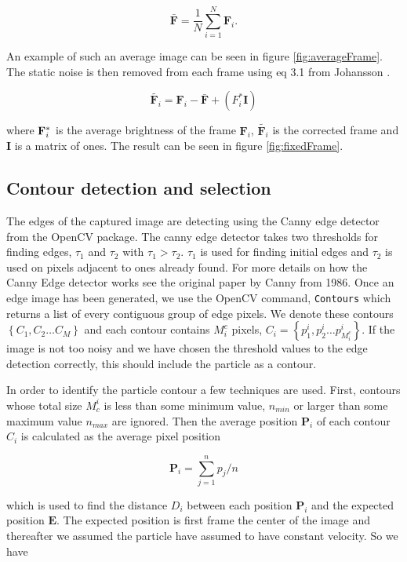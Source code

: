 \begin{equation}\label{eq:averageFrame}
\bar{\mathbf{F}} = \frac{1}{N}\sum\limits_{i=1}^{N} \mathbf{F}_i.
\end{equation}

An example of such an average image can be seen in figure \ref{fig:averageFrame}. The static noise is then removed from each frame using eq 3.1 from Johansson \cite{AntonThesis}.

\begin{equation}
\widetilde{\mathbf{F}_{i}} = \mathbf{F}_i - \bar{\mathbf{F}} + (F_i^*\mathbf{I})
\end{equation}

\noindent where $\mathbf{F}_i^*$ is the average brightness of the frame $\mathbf{F}_i$, $\widetilde{\mathbf{F}_{i}}$ is the corrected frame and $\mathbf{I}$ is a matrix of ones. The result can be seen in figure \ref{fig:fixedFrame}. 




\subsection{Contour detection and selection}
The edges of the captured image are detecting using the Canny edge detector from the OpenCV package. The canny edge detector takes two thresholds for finding edges, $\tau_1$ and $\tau_2$ with $\tau_1 > \tau_2$. $\tau_1$ is used for finding initial edges and $\tau_2$ is used on pixels adjacent to ones already found. For more details on how the Canny Edge detector works see the original paper by Canny from 1986\cite{Canny}. Once an edge image has been generated, we use the OpenCV command, \texttt{Contours} which returns a list of every contiguous group of edge pixels.  We denote these contours $\left\{C_1, C_2 \ldots C_M \right\}$ and each contour contains $M^c_i$ pixels, $C_i = \left\{p^i_1, p^i_2 \ldots p^i_{M^c_i}\right\} $. If the image is not too noisy and we have chosen the threshold values to the edge detection correctly, this should include the particle as a contour. 

In order to identify the particle contour  a few techniques are used. First, contours whose total size $ M_c^i$ is less than some minimum value, $ n_{min}$ or larger than some maximum value $n_{max}$ are ignored. Then the average position $\mathbf{P}_i$ of each contour $C_i$ is calculated as the average pixel position

\[
\mathbf{P}_i = \sum_{j=1}^n p_j/n
\]

which is used to find the distance $D_i$ between each position $\mathbf{P}_i$ and the expected position $\mathbf{E}$. The expected position is first frame the center of the image and thereafter we assumed the particle have assumed to have constant velocity. So we have 

